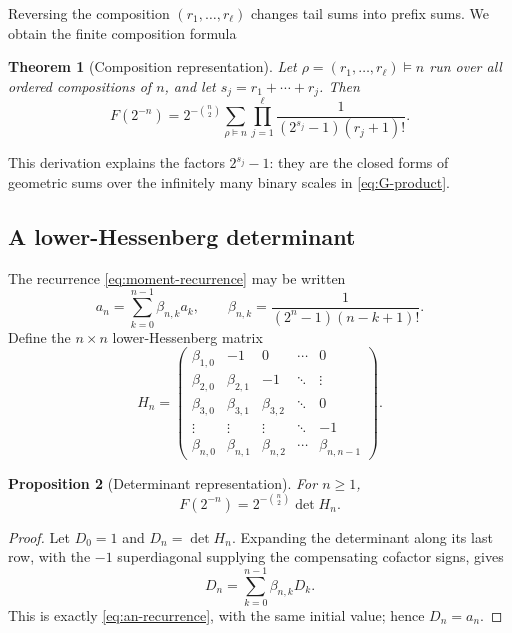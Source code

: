 \documentclass[11pt,oneside]{article}
\newtheorem{theorem}{Theorem}[section]
\newtheorem{proposition}[theorem]{Proposition}
\theoremstyle{definition}
\theoremstyle{remark}
\begin{document}
Reversing the composition $(r_1,\ldots,r_\ell)$ changes tail sums into prefix
sums.  We obtain the finite composition formula
\begin{theorem}[Composition representation]\label{thm:composition}
Let $\rho=(r_1,\ldots,r_\ell)\vDash n$ run over all ordered compositions of
$n$, and let $s_j=r_1+\cdots+r_j$.  Then
\begin{equation}\label{eq:composition-formula}
 \boxed{
 F(2^{-n})
 =2^{-\binom n2}
 \sum_{\rho\vDash n}
 \prod_{j=1}^{\ell}
 \frac1{(2^{s_j}-1)(r_j+1)!}.}
\end{equation}
\end{theorem}
This derivation explains the factors $2^{s_j}-1$: they are the closed forms of
geometric sums over the infinitely many binary scales in
\eqref{eq:G-product}.

\subsection{A lower-Hessenberg determinant}

The recurrence \eqref{eq:moment-recurrence} may be written
\begin{equation}\label{eq:an-recurrence}
 a_n=\sum_{k=0}^{n-1}\beta_{n,k}a_k,
 \qquad
 \beta_{n,k}=\frac1{(2^n-1)(n-k+1)!}.
\end{equation}
Define the $n\times n$ lower-Hessenberg matrix
\begin{equation}\label{eq:Hn-matrix}
 H_n=
 \begin{pmatrix}
 \beta_{1,0}&-1&0&\cdots&0\\
 \beta_{2,0}&\beta_{2,1}&-1&\ddots&\vdots\\
 \beta_{3,0}&\beta_{3,1}&\beta_{3,2}&\ddots&0\\
 \vdots&\vdots&\vdots&\ddots&-1\\
 \beta_{n,0}&\beta_{n,1}&\beta_{n,2}&\cdots&\beta_{n,n-1}
 \end{pmatrix}.
\end{equation}

\begin{proposition}[Determinant representation]\label{prop:determinant}
For $n\ge1$,
\begin{equation}\label{eq:determinant-formula}
 \boxed{
  F(2^{-n})=2^{-\binom n2}\det H_n.}
\end{equation}
\end{proposition}

\begin{proof}
Let $D_0=1$ and $D_n=\det H_n$.  Expanding the determinant along its last row,
with the $-1$ superdiagonal supplying the compensating cofactor signs, gives
\[
 D_n=\sum_{k=0}^{n-1}\beta_{n,k}D_k.
\]
This is exactly \eqref{eq:an-recurrence}, with the same initial value; hence
$D_n=a_n$.
\end{proof}
\end{document}
